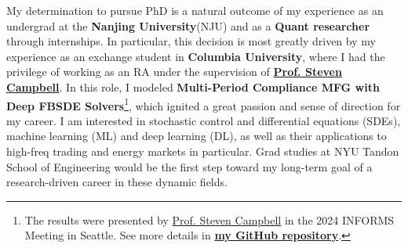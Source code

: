 \documentclass[12pt, a4paper]{article}
\newcommand{\MFG}{Multi-Period Compliance MFG with Deep FBSDE Solvers\xspace}
\newcommand{\GitHubMFG}{\href{https://github.com/OrangeAoo/Multi-Period-Compliance-MFG-FBSDEs}{\textbf{my GitHub repository}}\xspace}
\newcommand{\NJU}{Nanjing University\xspace}
\newcommand{\CU}{Columbia University\xspace}
\newcommand{\schoolLong}{NYU Tandon School of Engineering\xspace}
\newcommand{\SC}{\href{https://www.stevenacampbell.com/}{Prof. Steven Campbell}\xspace}
\begin{document}



My determination to pursue PhD is a natural outcome of my experience as an undergrad at the \textbf{\NJU}(NJU) and as a \textbf{Quant researcher} through internships. In particular, this decision is most greatly driven by my experience as an exchange student in \textbf{\CU}, where I had the privilege of working as an RA under the supervision of \textbf{\SC}. In this role, I modeled \textbf{\MFG}\footnote{The results were presented by \SC in the 2024 INFORMS Meeting in Seattle. See more details in \GitHubMFG.}, which ignited a great passion and sense of direction for my career. I am interested in stochastic control and differential equations (SDEs), machine learning (ML) and deep learning (DL), as well as their applications to high-freq trading and energy markets in particular. Grad studies at \schoolLong would be the first step toward my long-term goal of a research-driven career in these dynamic fields.

\end{document}
